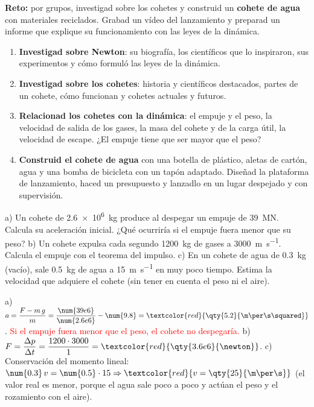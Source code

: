 \begin{marker}
    \textbf{Reto:} por grupos, investigad sobre los cohetes y construid un \textbf{cohete de agua} con materiales reciclados. Grabad un
    vídeo del lanzamiento y preparad un informe que explique su funcionamiento con las leyes de la dinámica.
\end{marker}

\begin{enumerate}[label=\numberballred]
    \item \textbf{Investigad sobre Newton}: su biografía, los científicos que lo inspiraron, sus experimentos y cómo formuló las leyes
    de la dinámica.
    \item \textbf{Investigad sobre los cohetes}: historia y científicos destacados, partes de un cohete, cómo funcionan y cohetes
    actuales y futuros.
    \item \textbf{Relacionad los cohetes con la dinámica}: el empuje y el peso, la velocidad de salida de los gases, la masa del cohete
    y de la carga útil, la velocidad de escape. ¿El empuje tiene que ser mayor que el peso?
    \item \textbf{Construid el cohete de agua} con una botella de plástico, aletas de cartón, agua y una bomba de bicicleta con un tapón
    adaptado. Diseñad la plataforma de lanzamiento, haced un presupuesto y lanzadlo en un lugar despejado y con supervisión.
\end{enumerate}

\begin{exercise}
    a) Un cohete de \qty{2.6e6}{\kg} produce al despegar un empuje de \qty{39}{\mega\newton}. Calcula su aceleración inicial. ¿Qué
    ocurriría si el empuje fuera menor que su peso? b) Un cohete expulsa cada segundo \qty{1200}{\kg} de gases a \qty{3000}{\m\per\s}.
    Calcula el empuje con el teorema del impulso. c) En un cohete de agua de \qty{0.3}{\kg} (vacío), sale \qty{0.5}{\kg} de agua a
    \qty{15}{\m\per\s} en muy poco tiempo. Estima la velocidad que adquiere el cohete (sin tener en cuenta el peso ni el aire).
    \begin{solu}
        a) \(a = \dfrac{F - m\,g}{m} = \dfrac{\num{39e6}}{\num{2.6e6}} - \num{9.8} = \textcolor{red}{\qty{5.2}{\m\per\s\squared}}\).
        \textcolor{red}{Si el empuje fuera menor que el peso, el cohete no despegaría.} b) \(F = \dfrac{\Delta p}{\Delta t} =
        \dfrac{1200 \cdot 3000}{1} = \textcolor{red}{\qty{3.6e6}{\newton}}\). c) Conservación del momento lineal:
        \(\num{0.3}\,v = \num{0.5} \cdot 15 \Rightarrow \textcolor{red}{v = \qty{25}{\m\per\s}}\) (el valor real es menor, porque el
        agua sale poco a poco y actúan el peso y el rozamiento con el aire).
    \end{solu}
\end{exercise}
